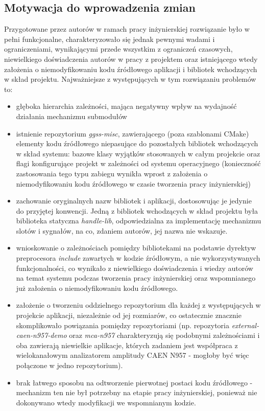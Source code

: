 \subsection{Motywacja do wprowadzenia zmian}
Przygotowane przez autorów w ramach pracy inżynierskiej rozwiązanie było w pełni funkcjonalne, charakteryzowało się jednak pewnymi wadami i ograniczeniami, wynikającymi przede wszystkim z ograniczeń czasowych, niewielkiego doświadczenia autorów w pracy z projektem oraz istniejącego wtedy założenia o niemodyfikowaniu kodu źródłowego aplikacji i bibliotek wchodzących w skład projektu. Najważniejsze z występujących w tym rozwiązaniu problemów to:
\begin{itemize}
    \item głęboka hierarchia zależności, mająca negatywny wpływ na wydajność działania mechanizmu submodułów
    \item istnienie repozytorium \emph{ggss-misc}, zawierającego (poza szablonami CMake) elementy kodu źródłowego niepasujące do pozostałych bibliotek wchodzących w skład systemu: bazowe klasy wyjątków stosowanych w całym projekcie oraz flagi konfigurujące projekt w zależności od systemu operacyjnego (konieczność zastosowania tego typu zabiegu wynikła wprost z założenia o niemodyfikowaniu kodu źródłowego w czasie tworzenia pracy inżynierskiej)
    \item zachowanie oryginalnych nazw bibliotek i aplikacji, dostosowując je jedynie do przyjętej konwencji. Jedną z bibliotek wchodzących w skład projektu była biblioteka statyczna \emph{handle-lib}, odpowiedzialna za implementację mechanizmu slotów i sygnałów, na co, zdaniem autorów, jej nazwa nie wskazuje.
    \item wnioskowanie o zależnościach pomiędzy bibliotekami na podstawie dyrektyw preprocesora \emph{include} zawartych w kodzie źródłowym, a nie wykorzystywanych funkcjonalności, co wynikało z niewielkiego doświadczenia i wiedzy autorów na temat systemu podczas tworzenia pracy inżynierskiej oraz wspomnianego już założenia o niemodyfikowaniu kodu źródłowego.
    \item założenie o tworzeniu oddzielnego repozytorium dla każdej z występujących w projekcie aplikacji, niezależnie od jej rozmiarów, co ostatecznie znacznie skomplikowało powiązania pomiędzy repozytoriami (np. repozytoria \emph{external-caen-n957-demo} oraz \emph{mca-n957} charakteryzują się podobnymi zależnościami i oba zawierają niewielkie aplikacje, których zadaniem jest współpraca z wielokanałowym analizatorem amplitudy CAEN N957 - mogłoby być więc połączone w jedno repozytorium).
    \item brak łatwego sposobu na odtworzenie pierwotnej postaci kodu źródłowego - mechanizm ten nie był potrzebny na etapie pracy inżynierskiej, ponieważ nie dokonywano wtedy modyfikacji we wspomnianym kodzie.
\end{itemize}


